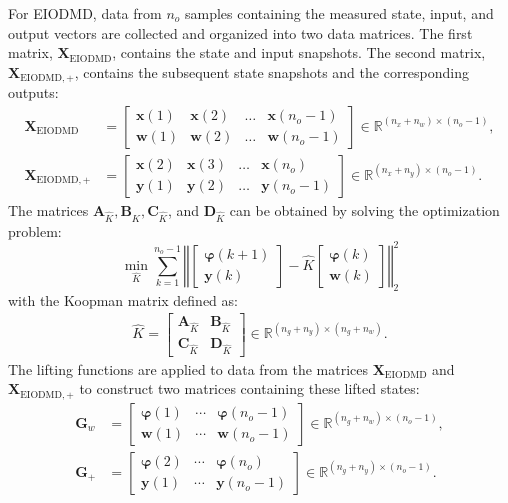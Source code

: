 For EIODMD, data from $n_o$ samples containing the measured state, input, and output vectors are collected and organized into two data matrices. The first matrix, $\bm{X}_{\text{EIODMD}}$, contains the state and input snapshots. The second matrix, $\bm{X}_{\text{EIODMD},+}$, contains the subsequent state snapshots and the corresponding outputs:
\begin{align} \label{eq:DataCollAIC5}
    \bm{X}_{\text{EIODMD}} &= \begin{bmatrix} 
        \bm{x}(1) & \bm{x}(2) & \dots & \bm{x}(n_o-1) \\
        \bm{w}(1) & \bm{w}(2) & \dots & \bm{w}(n_o-1)
    \end{bmatrix} \in \mathbb{R}^{(n_x+n_w)\times (n_o-1)}, \\
    \bm{X}_{\text{EIODMD},+} &= \begin{bmatrix} 
        \bm{x}(2) & \bm{x}(3) & \dots & \bm{x}(n_o) \\
        \bm{y}(1) & \bm{y}(2) & \dots & \bm{y}(n_o-1)
    \end{bmatrix} \in \mathbb{R}^{(n_x+n_y)\times (n_o-1)}.
\end{align}
%
The matrices $\bm{A}_{\hat{K}}, \bm{B}_{\hat{K}}, \bm{C}_{\hat{K}}$, and $\bm{D}_{\hat{K}}$ can be obtained by solving the optimization problem:
\begin{equation}
    \min_{\hat{K}} \sum_{k=1}^{n_{o}-1} \left\Vert \begin{bmatrix}
        \bm{\varphi}(k+1)\\ \bm{y}(k)
    \end{bmatrix} - \hat{K} \begin{bmatrix}
        \bm{\varphi}(k)\\ \bm{w}(k)
    \end{bmatrix} \right\Vert_{2}^{2} \label{eq:ApproxKalman}
\end{equation}
with the Koopman matrix defined as:
\begin{align*}
    \hat{K} = \begin{bmatrix}
        \bm{A}_{\hat{K}} & \bm{B}_{\hat{K}}\\ 
        \bm{C}_{\hat{K}} & \bm{D}_{\hat{K}} 
    \end{bmatrix} \in \mathbb{R}^{(n_g + n_y) \times (n_g + n_w)}.
\end{align*}
%
The lifting functions are applied to data from the matrices $\bm{X}_{\text{EIODMD}}$ and $\bm{X}_{\text{EIODMD},+}$ to construct two matrices containing these lifted states:
\begin{align}
    \bm{G}_w &= \begin{bmatrix} 
        \bm{\varphi}(1) & \cdots & \bm{\varphi}(n_{o}-1)\\
        \bm{w}(1) & \cdots & \bm{w}(n_{o}-1) 
    \end{bmatrix} \in \mathbb{R}^{(n_g + n_w) \times (n_o - 1)}, \\
    \bm{G}_{+} &= \begin{bmatrix}
        \bm{\varphi}(2) & \cdots & \bm{\varphi}(n_{o})\\
        \bm{y}(1) & \cdots & \bm{y}(n_{o}-1)
    \end{bmatrix} \in \mathbb{R}^{(n_g + n_y) \times (n_o - 1)}. \label{eq:Lplus}
\end{align}
